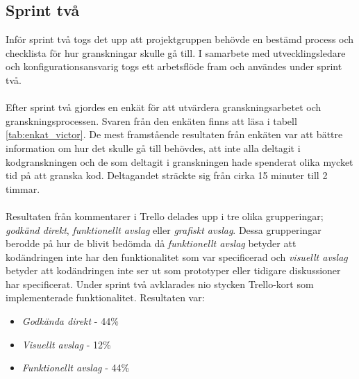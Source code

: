 \subsection{Sprint två}
Inför sprint två togs det upp att projektgruppen behövde en bestämd process och checklista för hur granskningar skulle gå till. I samarbete med utvecklingsledare och konfigurationsansvarig togs ett arbetsflöde fram och användes under sprint två.
\\ \\
Efter sprint två gjordes en enkät för att utvärdera granskningsarbetet och granskningsprocessen. Svaren från den enkäten finns att läsa i tabell \ref{tab:enkat_victor}. De mest framstående resultaten från enkäten var att bättre information om hur det skulle gå till behövdes, att inte alla deltagit i kodgranskningen och de som deltagit i granskningen hade spenderat olika mycket tid på att granska kod. Deltagandet sträckte sig från cirka 15 minuter till 2 timmar.
\\ \\
Resultaten från kommentarer i Trello delades upp i tre olika grupperingar; \textit{godkänd direkt}, \textit{funktionellt avslag} eller \textit{grafiskt avslag}. Dessa grupperingar berodde på hur de blivit bedömda då \textit{funktionellt avslag} betyder att kodändringen inte har den funktionalitet som var specificerad och \textit{visuellt avslag} betyder att kodändringen inte ser ut som prototyper eller tidigare diskussioner har specificerat. Under sprint två avklarades nio stycken Trello-kort som implementerade funktionalitet. Resultaten var:
\begin{itemize}
\item \textit{Godkända direkt} - 44\%
\item \textit{Visuellt avslag} - 12\%
\item \textit{Funktionellt avslag} - 44\%
\end{itemize}
